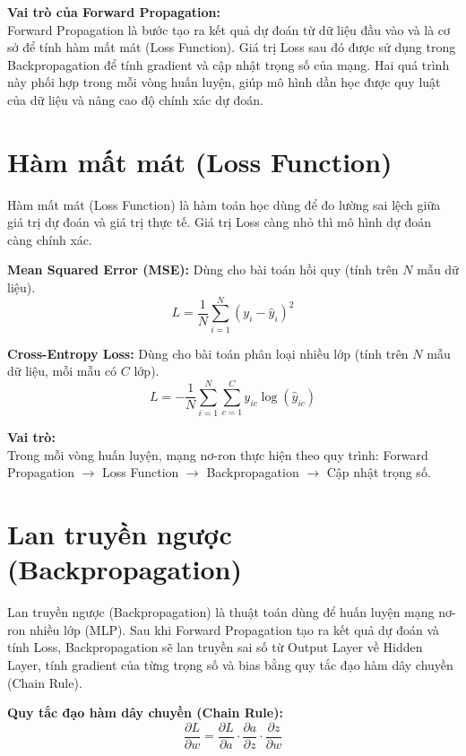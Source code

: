 \documentclass[12pt,a4paper]{report}
\begin{document}
\textbf{Vai trò của Forward Propagation:} \\
Forward Propagation là bước tạo ra kết quả dự đoán từ dữ liệu đầu vào và là cơ sở để tính hàm mất mát (Loss Function). Giá trị Loss sau đó được sử dụng trong Backpropagation để tính gradient và cập nhật trọng số của mạng. Hai quá trình này phối hợp trong mỗi vòng huấn luyện, giúp mô hình dần học được quy luật của dữ liệu và nâng cao độ chính xác dự đoán.

\section{Hàm mất mát (Loss Function)}
Hàm mất mát (Loss Function) là hàm toán học dùng để đo lường sai lệch giữa giá trị dự đoán và giá trị thực tế. Giá trị Loss càng nhỏ thì mô hình dự đoán càng chính xác. 

\textbf{Mean Squared Error (MSE):} Dùng cho bài toán hồi quy (tính trên $N$ mẫu dữ liệu).
\begin{equation}
    L = \frac{1}{N} \sum_{i=1}^N (y_i - \hat{y}_i)^2
\end{equation}

\textbf{Cross-Entropy Loss:} Dùng cho bài toán phân loại nhiều lớp (tính trên $N$ mẫu dữ liệu, mỗi mẫu có $C$ lớp).
\begin{equation}
    L = - \frac{1}{N} \sum_{i=1}^N \sum_{c=1}^C y_{ic} \log(\hat{y}_{ic})
\end{equation}

\textbf{Vai trò:} \\
Trong mỗi vòng huấn luyện, mạng nơ-ron thực hiện theo quy trình: Forward Propagation $\rightarrow$ Loss Function $\rightarrow$ Backpropagation $\rightarrow$ Cập nhật trọng số.

\section{Lan truyền ngược (Backpropagation)}
Lan truyền ngược (Backpropagation) là thuật toán dùng để huấn luyện mạng nơ-ron nhiều lớp (MLP). Sau khi Forward Propagation tạo ra kết quả dự đoán và tính Loss, Backpropagation sẽ lan truyền sai số từ Output Layer về Hidden Layer, tính gradient của từng trọng số và bias bằng quy tắc đạo hàm dây chuyền (Chain Rule).

\textbf{Quy tắc đạo hàm dây chuyền (Chain Rule):}
\begin{equation}
    \frac{\partial L}{\partial w} = \frac{\partial L}{\partial a} \cdot \frac{\partial a}{\partial z} \cdot \frac{\partial z}{\partial w}
\end{equation}
\end{document}
